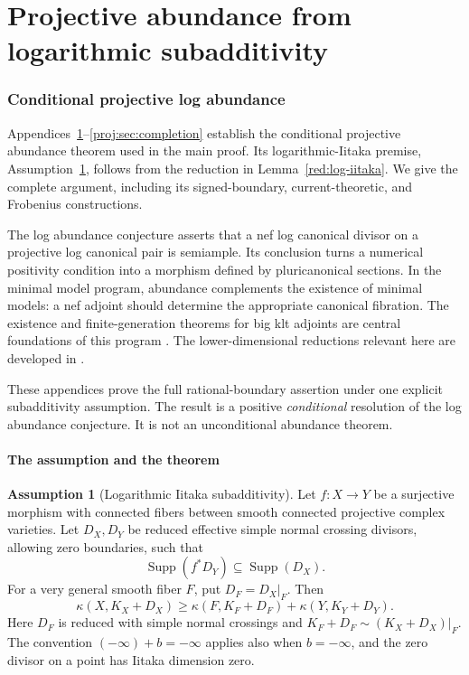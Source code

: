 \documentclass[11pt,letterpaper]{article}
\theoremstyle{definition}
\newtheorem{assumption}[theorem]{Assumption}
\theoremstyle{remark}
\begin{document}
 
\appendix
\part{Projective abundance from logarithmic subadditivity}
\section{Conditional projective log abundance}\label{proj:sec:introduction}

Appendices~\ref{proj:sec:introduction}--\ref{proj:sec:completion}
establish the conditional projective abundance theorem used in the main
proof. Its logarithmic-Iitaka premise,
Assumption~\ref{proj:asm:iitaka}, follows from the reduction in Lemma~\ref{red:log-iitaka}. We give the complete argument, including
its signed-boundary, current-theoretic, and Frobenius constructions.



The log abundance conjecture asserts that a nef log canonical divisor
on a projective log canonical pair is semiample. Its conclusion turns a
numerical positivity condition into a morphism defined by pluricanonical
sections. In the minimal model program, abundance complements the
existence of minimal models: a nef adjoint should determine the
appropriate canonical fibration. The existence and finite-generation
theorems for big klt adjoints are central foundations of this program
\cite{BCHM}. The lower-dimensional reductions relevant here are
developed in \cite{Proj-Hashizume2018,Proj-FujinoGongyoRings2014}.

These appendices prove the full rational-boundary assertion under one
explicit subadditivity assumption. The result is a positive
\emph{conditional} resolution of the log abundance conjecture.
It is not an unconditional abundance theorem.

\subsection{The assumption and the theorem}

\begin{assumption}[Logarithmic Iitaka subadditivity]\label{proj:asm:iitaka}
Let \(f:X\to Y\) be a surjective morphism with connected fibers between
smooth connected projective complex varieties. Let \(D_X,D_Y\) be
reduced effective simple normal crossing divisors, allowing zero
boundaries, such that
\[
  \operatorname{Supp}(f^*D_Y)\subseteq\operatorname{Supp}(D_X).
\]
For a very general smooth fiber \(F\), put \(D_F=D_X|_F\). Then
\[
 \kappa(X,K_X+D_X)\ge
 \kappa(F,K_F+D_F)+\kappa(Y,K_Y+D_Y).
\]
Here \(D_F\) is reduced with simple normal crossings and
\(K_F+D_F\sim(K_X+D_X)|_F\). The convention
\((-\infty)+b=-\infty\) applies also when \(b=-\infty\), and the zero
divisor on a point has Iitaka dimension zero.
\end{assumption}
\end{document}
